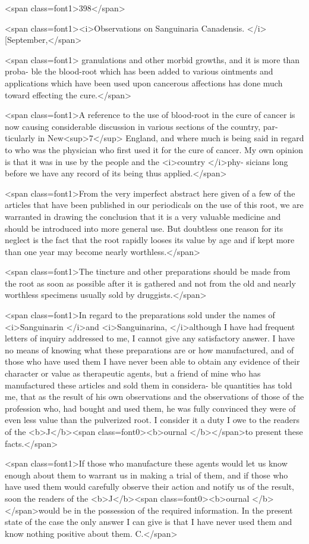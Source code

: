 <span class=font1>398</span>

<span class=font1><i>Observations on Sanguinaria Canadensis. </i>[September,</span>

<span class=font1> granulations and other morbid growths, and it is more than proba-
ble the blood-root which has been added to various ointments and
applications which have been used upon cancerous affections has done
much toward effecting the cure.</span>

<span class=font1>A reference to the use of blood-root in the cure of cancer is now
causing considerable discussion in various sections of the country, par-
ticularly in New<sup>7</sup> England, and where much is being said in regard to
who was the physician who first used it for the cure of cancer. My
own opinion is that it was in use by the people and the <i>country </i>phy-
sicians long before we have any record of its being thus applied.</span>

<span class=font1>From the very imperfect abstract here given of a few of the articles
that have been published in our periodicals on the use of this root, we are
warranted in drawing the conclusion that it is a very valuable medicine
and should be introduced into more general use. But doubtless one
reason for its neglect is the fact that the root rapidly looses its value by
age and if kept more than one year may become nearly worthless.</span>

<span class=font1>The tincture and other preparations should be made from the root as
soon as possible after it is gathered and not from the old and nearly
worthless specimens usually sold by druggists.</span>

<span class=font1>In regard to the preparations sold under the names of <i>Sanguinarin
</i>and <i>Sanguinarina, </i>although I have had frequent letters of inquiry
addressed to me, I cannot give any satisfactory answer. I have no
means of knowing what these preparations are or how manufactured,
and of those who have used them I have never been able to obtain any
evidence of their character or value as therapeutic agents, but a friend
of mine who has manufactured these articles and sold them in considera-
ble quantities has told me, that as the result of his own observations
and the observations of those of the profession who, had bought and
used them, he was fully convinced they were of even less value than
the pulverized root. I consider it a duty I owe to the readers of the
<b>J</b><span class=font0><b>ournal </b></span>to present these facts.</span>

<span class=font1>If those who manufacture these agents would let us know enough
about them to warrant us in making a trial of them, and if those who
have used them would carefully observe their action and notify us of
the result, soon the readers of the <b>J</b><span class=font0><b>ournal </b></span>would be in the possession
of the required information. In the present state of the case the only
answer I can give is that I have never used them and know nothing
positive about them. C.</span>\endinput
